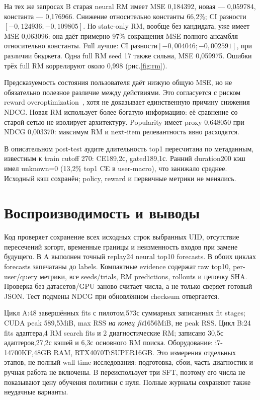 \documentclass[10pt,a4paper,twocolumn]{article}
\begin{document}
На тех же запросах B старая neural RM имеет MSE 0{,}184392,
новая --- 0{,}059784, константа --- 0{,}176966. Снижение относительно
константы 66{,}2\%; CI разности$[-0{,}124936;-0{,}109805]$.
Но state-only RM, вообще без кандидата, уже имеет MSE 0{,}063096:
она даёт примерно 97\% сокращения MSE полного ансамбля относительно константы.
Full лучше: CI разности$[-0{,}004046;-0{,}002591]$, при различии бюджета.
Одна full RM seed 17 также сильна, MSE 0{,}059975.
Ошибки трёх full RM коррелируют около 0{,}998 (рис.\ref{fig:rm}).

Предсказуемость состояния пользователя даёт низкую общую MSE, но не
обязательно полезное различие между действиями. Это согласуется с
риском reward overoptimization~\cite{overopt}, хотя не доказывает
единственную причину снижения NDCG. Новая RM использует более богатую
информацию: её сравнение со старой сетью не изолирует архитектуру.
Popularity имеет proxy 0{,}648050 при NDCG 0{,}003370: максимум RM и next-item
релевантность явно расходятся.

В описательном post-test аудите длительность top1 пересчитана по
метаданным, известным к train cutoff 270: CE189{,}2с, gated189{,}1с.
Ранний duration200 кэш имел unknown=0 (13{,}2\% top1 CE в user-macro),
что занижало среднее. Исходный кэш сохранён; policy, reward и первичные
метрики не менялись.

\section{Воспроизводимость и выводы}

Код проверяет сохранение всех исходных строк выбранных UID, отсутствие
пересечений когорт, временные границы и неизменность входов при замене
будущего. В A выполнен точный replay24 neural top10 forecasts.
В обоих циклах forecasts запечатаны до labels. Компактные evidence
содержат raw top10, per-user/query метрики, все seeds/trials, RM predictions,
rollouts и цепочку SHA. Проверка без датасетов/GPU заново считает числа,
а не только сверяет готовый JSON. Тест подмены NDCG при обновлённом
checksum отвергается.

Цикл A:48 завершённых fits с пилотом,573с суммарных записанных fit stages;
CUDA peak 589{,}5MiB, max RSS \emph{на конец fit}1656MiB, не peak RSS.
Цикл B:24 fits адаптера,4 RM search fits и 2 диагностические RM;
записано 30{,}5с адаптеров,27{,}2с кэшей и 6{,}3с основного RM поиска.
Оборудование: i7-14700KF,48GB RAM, RTX4070TiSUPER16GB.
Это измерения отдельных этапов, не полный wall time исследования:
подготовка, сбои, часть диагностик и ручная работа не включены.
B переиспользует три SFT, поэтому его числа не показывают цену обучения
политики с нуля. Полные журналы сохраняют также неудачные варианты.
\end{document}
